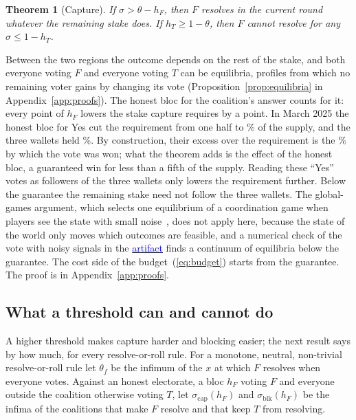 \documentclass[conference,compsoc]{IEEEtran}
\newcommand{\artifactlink}[1]{\texorpdfstring{\href{https://github.com/submissionrepo/too-big-to-vote-on-artifact}{\textcolor{blue}{#1}}}{#1}}
\newtheorem{theorem}{Theorem}
\newcommand{\hF}{h_{F}}
\newcommand{\hT}{h_{T}}
\newcommand{\sigcap}{\sigma_{\mathrm{cap}}}
\newcommand{\sigblk}{\sigma_{\mathrm{blk}}}
\begin{document}
\begin{theorem}[Capture]
\label{thm:capture}
 If $\sigma > \theta - \hF$, then $F$ resolves in the current round whatever the remaining stake does. If $\hT \ge 1 - \theta$, then $F$ cannot resolve for any $\sigma \le 1 - \hT$.
\end{theorem}
 Between the two regions the outcome depends on the rest of the stake, and both everyone voting $F$ and everyone voting $T$ can be equilibria, profiles from which no remaining voter gains by changing its vote (Proposition~\ref{prop:equilibria} in Appendix~\ref{app:proofs}). The honest bloc for the coalition's answer counts for it: every point of $\hF$ lowers the stake capture requires by a point. In March 2025 the honest bloc for Yes cut the requirement from one half to \marchThetaMinusHF\% of the supply, and the three wallets held \marchAlpha\%. By construction, their excess over the requirement is the \marchMarginPct\% by which the vote was won; what the theorem adds is the effect of the honest bloc, a guaranteed win for less than a fifth of the supply. Reading these ``Yes'' votes as followers of the three wallets only lowers the requirement further. Below the guarantee the remaining stake need not follow the three wallets. The global-games argument, which selects one equilibrium of a coordination game when players see the state with small noise~\cite{carlsson1993}, does not apply here, because the state of the world only moves which outcomes are feasible, and a numerical check of the vote with noisy signals in the \artifactlink{artifact} finds a continuum of equilibria below the guarantee. The cost side of the budget~(\ref{eq:budget}) starts from the guarantee. The proof is in Appendix~\ref{app:proofs}.

\subsection{What a threshold can and cannot do}
\label{sec:tally}
 A higher threshold makes capture harder and blocking easier; the next result says by how much, for every resolve-or-roll rule. For a monotone, neutral, non-trivial resolve-or-roll rule let $\theta_f$ be the infimum of the $x$ at which $F$ resolves when everyone votes. Against an honest electorate, a bloc $\hF$ voting $F$ and everyone outside the coalition otherwise voting $T$, let $\sigcap(\hF)$ and $\sigblk(\hF)$ be the infima of the coalitions that make $F$ resolve and that keep $T$ from resolving.
\end{document}
